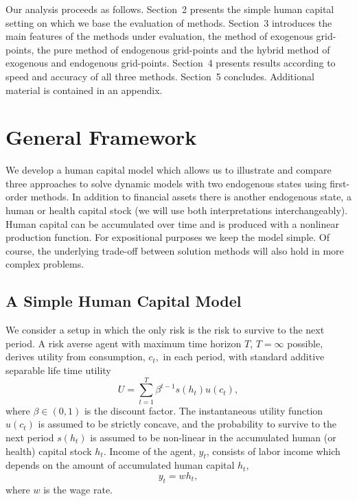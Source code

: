 \documentclass[a4paper,12pt]{article}%
\begin{document}
Our analysis proceeds as follows. Section~2 presents the simple human capital setting on which we base the evaluation of methods. Section~3 introduces the main features of the methods under evaluation, the method of exogenous grid-points, the pure method of endogenous grid-points and the hybrid method of exogenous and endogenous grid-points. Section~4 presents results according to speed and accuracy of all three methods. Section~5 concludes. Additional material is contained in an appendix.

\section{General Framework}

We develop a human capital model which allows us to illustrate and compare three approaches to solve dynamic models with two endogenous states using first-order methods. In addition to financial assets there is another endogenous state, a human or health capital stock (we will use both interpretations interchangeably). Human capital can be accumulated over time and is produced with a nonlinear production function. For expositional purposes we keep the model simple. Of course, the underlying trade-off between solution methods will also hold in more complex problems.

\subsection{A Simple Human Capital Model}

\label{ss:simplehkmodel}

We consider a setup in which the only risk is the risk to survive to the next period. A risk averse agent with maximum time horizon $T$, $T=\infty$ possible, derives utility from consumption, $c_{t},$ in each period, with standard additive separable life time utility
\[
U=\sum_{t=1}^{T}\beta^{t-1}s\left( h_{t} \right)  u\left( c_{t}\right),
\]
where $\beta\in\left( 0,1\right)$ is the discount factor. The instantaneous utility function~$u\left( c_{t}\right)$ is assumed to be strictly concave, and the probability to survive to the next period $s\left( h_{t}\right)$ is assumed to be non-linear in the accumulated human (or health) capital stock $h_{t}$. Income of the agent, $y_{t}$, consists of labor income which depends on the amount of accumulated human capital $h_{t}$,
\[
y_{t}=wh_{t},
\]
where $w$ is the wage rate.
\end{document}
